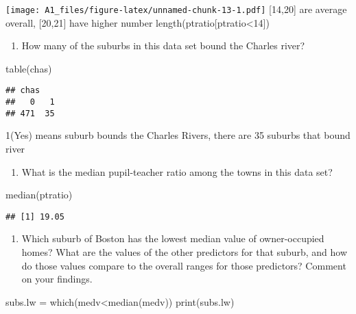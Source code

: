 \documentclass[
]{article}
\newenvironment{Shaded}{\begin{snugshade}}{\end{snugshade}}
\newcommand{\FunctionTok}[1]{\textcolor[rgb]{0.00,0.00,0.00}{#1}}
\newcommand{\NormalTok}[1]{#1}
\newcommand{\OtherTok}[1]{\textcolor[rgb]{0.56,0.35,0.01}{#1}}
\newcommand{\SpecialCharTok}[1]{\textcolor[rgb]{0.00,0.00,0.00}{#1}}
\providecommand{\tightlist}{%
  \setlength{\itemsep}{0pt}\setlength{\parskip}{0pt}}
\begin{document}
\texttt{[image: A1\_files/figure-latex/unnamed-chunk-13-1.pdf]}
{[}14,20{]} are average overall, {[}20,21{]} have higher number
length(ptratio{[}ptratio\textless14{]})

\begin{enumerate}
\def\labelenumi{(\alph{enumi})}
\setcounter{enumi}{4}
\tightlist
\item
  How many of the suburbs in this data set bound the Charles river?
\end{enumerate}

\begin{Shaded}
\begin{Highlighting}[]
\FunctionTok{table}\NormalTok{(chas)}
\end{Highlighting}
\end{Shaded}

\begin{verbatim}
## chas
##   0   1 
## 471  35
\end{verbatim}

1(Yes) means suburb bounds the Charles Rivers, there are 35 suburbs that
bound river

\begin{enumerate}
\def\labelenumi{(\alph{enumi})}
\setcounter{enumi}{5}
\tightlist
\item
  What is the median pupil-teacher ratio among the towns in this data
  set?
\end{enumerate}

\begin{Shaded}
\begin{Highlighting}[]
\FunctionTok{median}\NormalTok{(ptratio)}
\end{Highlighting}
\end{Shaded}

\begin{verbatim}
## [1] 19.05
\end{verbatim}

\begin{enumerate}
\def\labelenumi{(\alph{enumi})}
\setcounter{enumi}{6}
\tightlist
\item
  Which suburb of Boston has the lowest median value of owner-occupied
  homes? What are the values of the other predictors for that suburb,
  and how do those values compare to the overall ranges for those
  predictors? Comment on your findings.
\end{enumerate}

\begin{Shaded}
\begin{Highlighting}[]
\NormalTok{subs.lw }\OtherTok{=} \FunctionTok{which}\NormalTok{(medv}\SpecialCharTok{\textless{}}\FunctionTok{median}\NormalTok{(medv))}
\FunctionTok{print}\NormalTok{(subs.lw)}
\end{Highlighting}
\end{Shaded}
\end{document}
